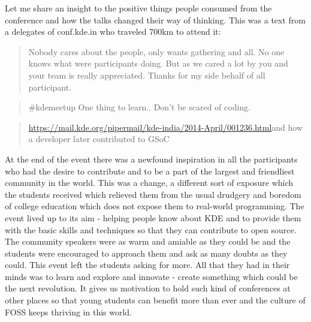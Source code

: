 Let me share an insight to the positive things people consumed from the conference and how the talks changed their way of thinking. This was a text from a delegates of conf.kde.in  who traveled 700km to attend it:

\begin{quote}Nobody cares about the people, only wants gathering and all. No one knows what were participants doing. But as we cared a lot by you and your team is really appreciated. Thanks for my side behalf of all participant.\end{quote}

\begin{quote}\#kdemeetup One thing to learn.. Don’t be scared of coding.\end{quote}

\begin{quote}\url{https://mail.kde.org/pipermail/kde-india/2014-April/001236.html}{and how a developer later contributed to GSoC}\end{quote} 

At the end of the event there was a newfound inspiration in all the participants who had the desire to contribute and to be a part of the largest and friendliest community in the world. This was a change, a different sort of exposure which the students received which relieved them from the usual drudgery and boredom of college education which does not expose them to real-world programming. The event lived up to its aim - helping people know about KDE and to provide them with the basic skills and techniques so that they can contribute to open source. The community speakers were as warm and amiable as they could be and the students were encouraged to approach them and ask as many doubts as they could. This event left the students asking for more. All that they had in their minds was to learn and explore and innovate - create something which could be the next revolution. It gives us motivation to hold such kind of conferences at other places so that young students can benefit more than ever and the culture of FOSS keeps thriving in this world.
